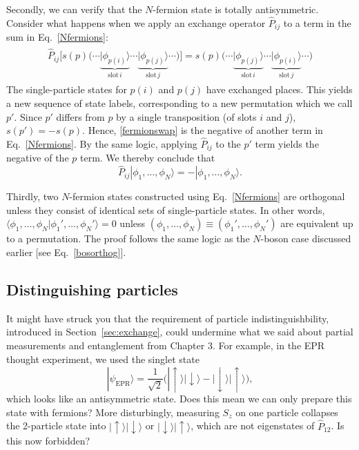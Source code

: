 \documentclass[prx,12pt]{revtex4-2}
\begin{document}
Secondly, we can verify that the $N$-fermion state is totally
antisymmetric.  Consider what happens when we apply an exchange
operator $\hat{P}_{ij}$ to a term in the sum in Eq.~\eqref{Nfermions}:
\begin{align}
  \begin{aligned}
    \hat{P}_{ij} \Big[s(p)\big( \cdots
      \underbrace{|\phi_{p(i)}\rangle}_{\textrm{slot}\,i} \cdots
      \underbrace{|\phi_{p(j)}\rangle}_{\textrm{slot}\,j} \cdots \big)\Big]
    = s(p)\big( \cdots
      \underbrace{|\phi_{p(j)}\rangle}_{\textrm{slot}\,i} \cdots
      \underbrace{|\phi_{p(i)}\rangle}_{\textrm{slot}\,j} \cdots \big)
  \end{aligned}
  \label{fermionswap}
\end{align}
The single-particle states for $p(i)$ and $p(j)$ have exchanged
places.  This yields a new sequence of state labels, corresponding to
a new permutation which we call $p'$.  Since $p'$ differs from $p$ by
a single transposition (of slots $i$ and $j$), $s(p') = - s(p)$.
Hence, \eqref{fermionswap} is the negative of another term in
Eq.~\eqref{Nfermions}.  By the same logic, applying $\hat{P}_{ij}$ to
the $p'$ term yields the negative of the $p$ term.  We thereby
conclude that
\begin{equation}
  \hat{P}_{ij} |\phi_1,\dots,\phi_N\rangle = - |\phi_1,\dots,\phi_N\rangle.
\end{equation}

Thirdly, two $N$-fermion states constructed using
Eq.~\eqref{Nfermions} are orthogonal unless they consist of identical
sets of single-particle states.  In other words, $\langle \phi_1,
\dots, \phi_N| \phi_1', \dots, \phi_N'\rangle = 0$ unless $(\phi_1,
\dots, \phi_N) \equiv (\phi_1', \dots, \phi_N')$ are equivalent up to
a permutation.  The proof follows the same logic as the $N$-boson case
discussed earlier [see Eq.~\eqref{bosorthog}].

\subsection{Distinguishing particles}
\label{sec:distinguishability}

It might have struck you that the requirement of particle
indistinguishbility, introduced in Section~\ref{sec:exchange}, could
undermine what we said about partial measurements and entanglement
from Chapter 3.  For example, in the EPR thought experiment, we used
the singlet state
\begin{equation}
  |\psi_{\mathrm{EPR}}\rangle = \frac{1}{\sqrt{2}} \Big(|\!\uparrow\rangle |\!\downarrow\rangle
  - |\!\downarrow\rangle |\!\uparrow\rangle \Big),
  \label{EPR}
\end{equation}
which looks like an antisymmetric state.  Does this mean we can only
prepare this state with fermions?  More disturbingly, measuring
${S}_z$ on one particle collapses the 2-particle state into
$|\!\uparrow\rangle |\!\downarrow\rangle$ or $|\!\downarrow\rangle
|\!\uparrow\rangle$, which are not eigenstates of $\hat{P}_{12}$.  Is
this now forbidden?
\end{document}
